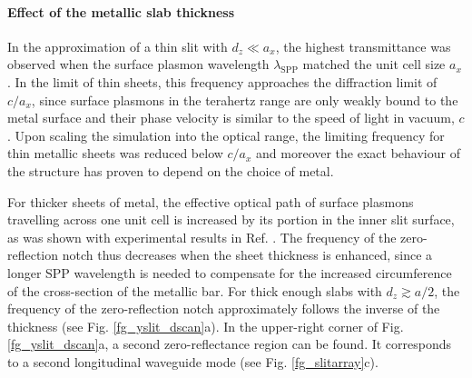 \paragraph{Effect of the metallic slab thickness}%

In the approximation of a thin slit with $d_z \ll a_x$, the highest transmittance was observed when the surface plasmon wavelength $\lambda_{\text{SPP}}$ matched the unit cell size $a_x$. 
In the limit of thin sheets, this frequency approaches the diffraction limit of $c/a_x$, since surface plasmons in the terahertz range are only weakly bound to the metal surface and their phase velocity is similar to the speed of light in vacuum, $c$. Upon scaling the simulation into the optical range, the limiting frequency for thin metallic sheets was reduced below $c/a_x$ and moreover the exact behaviour of the structure has proven to depend on the choice of metal.

For thicker sheets of metal, the effective optical path of surface plasmons travelling across one unit cell is increased by its portion in the inner slit surface, as was shown with experimental results in Ref. \cite{weiner2011electromagnetics}. The frequency of the zero-reflection notch thus decreases when the sheet thickness is enhanced, since a longer SPP wavelength is needed to compensate for the increased circumference of the cross-section of the metallic bar. 
For thick enough slabs with $d_z \gtrsim a/2$, the frequency of the zero-reflection notch approximately follows the inverse of the thickness (see Fig. \ref{fg_yslit_dscan}a). 
In the upper-right corner of Fig. \ref{fg_yslit_dscan}a, a second zero-reflectance region can be found. It corresponds to a second longitudinal waveguide mode (see Fig. \ref{fg_slitarray}c). %

